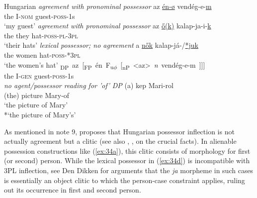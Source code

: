 \documentclass[output=paper
,modfonts
,nonflat]{langsci/langscibook}
\begin{document}
\begin{exe}
	\ex Hungarian \citep[90]{Szabolcsi1983} \label{ex:34}
	\xlist
	\ex\label{ex:34a} \textit{agreement with pronominal possessor} \newline
	\gll az   \underline{én-ø} vendég-e-\underline{m}\\
	the I-\textsc{nom} guest-\textsc{poss}{}-1s\\
	\glt `my guest'  	
	\ex \textit{agreement with pronominal possessor} \newline
	\gll az   \underline{\H{o}(k)}  kalap-ja-i-\underline{k}\\
	the they hat-\textsc{poss}{}-\textsc{pl}{}-\textsc{3pl}\\
	\glt `their hats'
	\ex \textit{lexical possessor; no agreement}\newline
	\gll  a   \underline{n\H{o}k}       kalap-já-/\underline{*juk}\\
	the   women hat-\textsc{poss}{}-*\textsc{3pl}\\
	\glt `the women's hat' 
	\ex \label{ex:34d}
	\gll \mbox{{\lbrack}\textsubscript{DP} az [\textsubscript{FP} én    F\textsubscript{u}\textsubscript{$\phi$} [\textsubscript{nP} <az> \textit{n} vendég-e-m ]]]{\rbrack}}\\
	\hspace{0.6cm}the      \hspace{-5.4cm}I-\textsc{gen}                     \hspace{-2.7cm}guest-\textsc{poss}-1s\\
	\ex \textit{no agent/possessor reading for 'of' DP} \newline
	\gll (a) kep       Mari-rol\\
	(the) picture Mary-of\\
	\glt `the picture of Mary'\\ {*}`the picture of Mary's'
	\endxlist
\end{exe}
As mentioned in note 9, \citet{Den_Dikken2015} proposes that Hungarian possessor inflection is not actually agreement but a clitic (see also \citealt{Den_Dikken1999}, \citealt{Bartos1999}, \citealt{Kiss2002} on the crucial facts). In alienable possession constructions like (\ref{ex:34a}), this clitic consists of morphology for first (or second) person. While the lexical possessor in (\ref{ex:34d}) is incompatible with 3PL inflection, see Den Dikken for arguments that the \textit{ja} morpheme in such cases is essentially an object clitic to which the person-case constraint applies, ruling out its occurrence in first and second person. 
\end{document}
